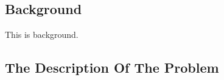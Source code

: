 \documentclass[../main]{subfiles}
\begin{document}
\subsection{Background}
This is background.

    
\subsection{The Description Of The Problem}
\end{document}
